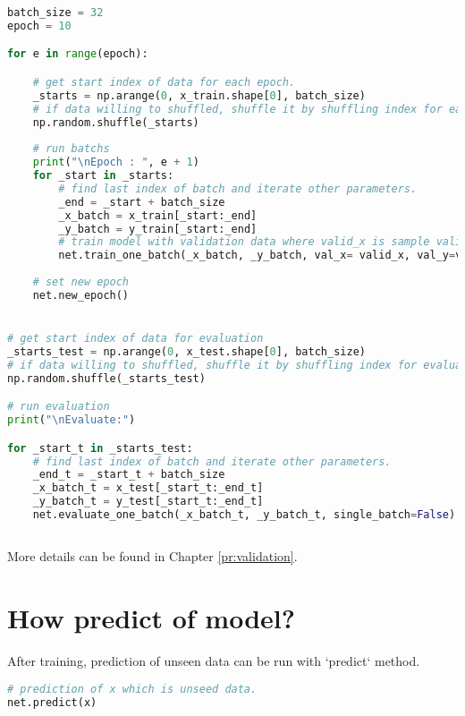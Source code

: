 \documentclass[12pt]{report}
\begin{document}
\begin{lstlisting}[language=Python, numbers=none, caption={Train and evaluate batch with validation data.}, label={ex:train-batch-val-data}]
batch_size = 32
epoch = 10

for e in range(epoch):

	# get start index of data for each epoch.
	_starts = np.arange(0, x_train.shape[0], batch_size)
	# if data willing to shuffled, shuffle it by shuffling index for each epoch.
	np.random.shuffle(_starts)
	
	# run batchs 
	print("\nEpoch : ", e + 1)
	for _start in _starts:
		# find last index of batch and iterate other parameters.
		_end = _start + batch_size                
		_x_batch = x_train[_start:_end]
		_y_batch = y_train[_start:_end]
		# train model with validation data where valid_x is sample validation data and valid_y is labels of them.
		net.train_one_batch(_x_batch, _y_batch, val_x= valid_x, val_y=valid_y, printing=['loss', 'accuracy', 'val_loss', 'val_acc'], single_batch=False)
		
	# set new epoch 
	net.new_epoch()


# get start index of data for evaluation
_starts_test = np.arange(0, x_test.shape[0], batch_size)
# if data willing to shuffled, shuffle it by shuffling index for evaluation
np.random.shuffle(_starts_test)

# run evaluation
print("\nEvaluate:")

for _start_t in _starts_test:
	# find last index of batch and iterate other parameters.
	_end_t = _start_t + batch_size                
	_x_batch_t = x_test[_start_t:_end_t]
	_y_batch_t = y_test[_start_t:_end_t]
	net.evaluate_one_batch(_x_batch_t, _y_batch_t, single_batch=False)
	
\end{lstlisting}

More details can be found in Chapter \ref{pr:validation}.




\section{How predict of model?}
\paragraph{}
After training, prediction of unseen data can be run with `predict` method.

\begin{lstlisting}[language=Python, numbers=none, caption={Predict data on trained model.}, label={ex:predict}]
# prediction of x which is unseed data.
net.predict(x)
\end{lstlisting}
\end{document}
